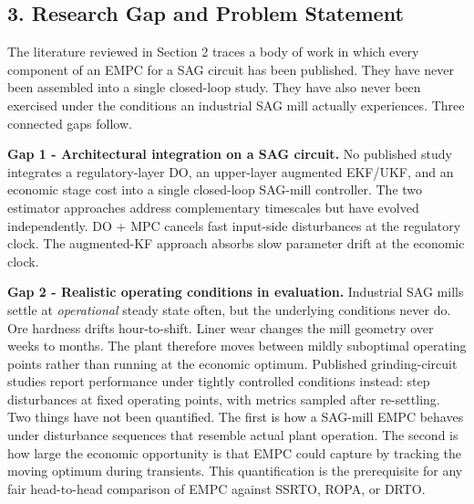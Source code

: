 \documentclass[
  14pt,
]{extarticle}
\begin{document}
\subsection{3. Research Gap and Problem
Statement}\label{research-gap-and-problem-statement}

The literature reviewed in Section 2 traces a body of work in which
every component of an EMPC for a SAG circuit has been published. They
have never been assembled into a single closed-loop study. They have
also never been exercised under the conditions an industrial SAG mill
actually experiences. Three connected gaps follow.

\textbf{Gap 1 - Architectural integration on a SAG circuit.} No
published study integrates a regulatory-layer DO, an upper-layer
augmented EKF/UKF, and an economic stage cost into a single closed-loop
SAG-mill controller. The two estimator approaches address complementary
timescales but have evolved independently. DO + MPC cancels fast
input-side disturbances at the regulatory clock. The augmented-KF approach
absorbs slow parameter drift at the economic clock.

\textbf{Gap 2 - Realistic operating conditions in evaluation.}
Industrial SAG mills settle at \emph{operational} steady state often,
but the underlying conditions never do. Ore hardness drifts
hour-to-shift. Liner wear changes the mill geometry over weeks to
months. The plant therefore moves between mildly suboptimal operating
points rather than running at the economic optimum. Published
grinding-circuit studies report performance under tightly controlled
conditions instead: step disturbances at fixed operating points, with
metrics sampled after re-settling. Two things have not been quantified.
The first is how a SAG-mill EMPC behaves under disturbance sequences
that resemble actual plant operation. The second is how large the
economic opportunity is that EMPC could capture by tracking the moving
optimum during transients. This quantification is the prerequisite for
any fair head-to-head comparison of EMPC against SSRTO, ROPA, or DRTO.
\end{document}
